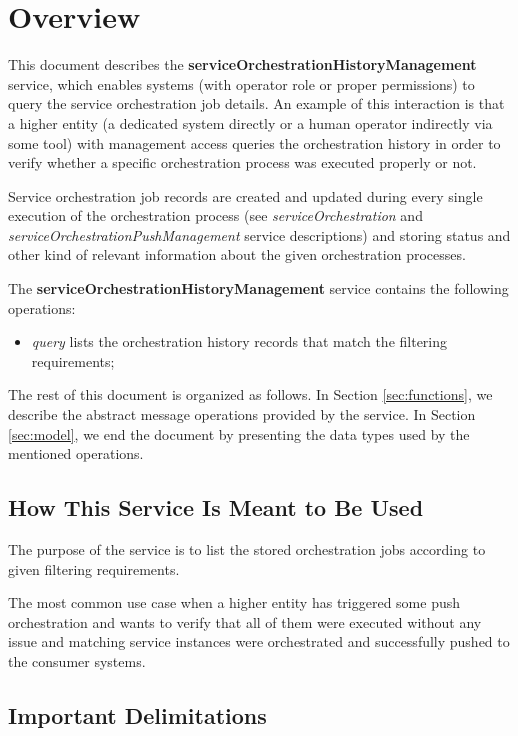 \documentclass[a4paper]{arrowhead}
\begin{document}
\tableofcontents
\newpage

\section{Overview}
\label{sec:overview}
This document describes the \textbf{serviceOrchestrationHistoryManagement} service, which enables systems (with operator role or proper permissions) to query the service orchestration job details. An example of this interaction is that a higher entity (a dedicated system directly or a human operator indirectly via some tool) with management access queries the orchestration history in order to verify whether a specific orchestration process was executed properly or not. 

Service orchestration job records are created and updated during every single execution of the orchestration process (see \textit{serviceOrchestration} and \textit{serviceOrchestrationPushManagement} service descriptions) and storing status and other kind of relevant information about the given orchestration processes.

The \textbf{serviceOrchestrationHistoryManagement} service contains the following operations:

\begin{itemize}
    \item \textit{query} lists the orchestration history records that match the filtering requirements;
\end{itemize}

The rest of this document is organized as follows.
In Section \ref{sec:functions}, we describe the abstract message operations provided by the service.
In Section \ref{sec:model}, we end the document by presenting the data types used by the mentioned operations.

\subsection{How This Service Is Meant to Be Used}

The purpose of the service is to list the stored orchestration jobs according to given filtering requirements.

The most common use case when a higher entity has triggered some push orchestration and wants to verify that all of them were executed without any issue and matching service instances were orchestrated and successfully pushed to the consumer systems.

\subsection{Important Delimitations}
\label{sec:delimitations}
\end{document}
